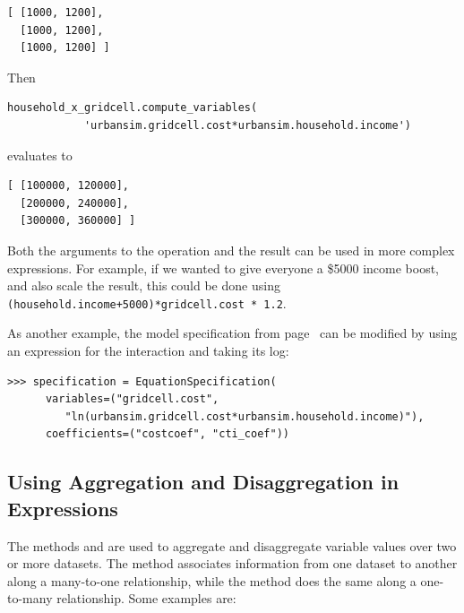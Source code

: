 \begin{verbatim}
[ [1000, 1200],
  [1000, 1200],
  [1000, 1200] ]
\end{verbatim}

Then
\begin{verbatim}
household_x_gridcell.compute_variables(
            'urbansim.gridcell.cost*urbansim.household.income')
\end{verbatim}

evaluates to
\begin{verbatim}
[ [100000, 120000],
  [200000, 240000],
  [300000, 360000] ]
\end{verbatim}

Both the arguments to the operation and the result can be used in more
complex expressions.  For example, if we wanted to give everyone
a \$5000 income boost, and also scale the result, this could be done using
\verb|(household.income+5000)*gridcell.cost * 1.2|.

As another example, the model specification from
page~\pageref{page:iv-spec} can be modified by using an expression for the
interaction and taking its log:

\begin{verbatim}
>>> specification = EquationSpecification(
      variables=("gridcell.cost",
         "ln(urbansim.gridcell.cost*urbansim.household.income)"),
      coefficients=("costcoef", "cti_coef"))
\end{verbatim}


\subsection{Using Aggregation and Disaggregation in Expressions}
\label{sec:urbansim-tutorial-aggregation}
 

The methods  and  are used to
aggregate and disaggregate variable values over two or more datasets.  
  The  method associates
information from one dataset to another along a many-to-one relationship, while
the  method does the same along a one-to-many relationship. Some
examples are:

